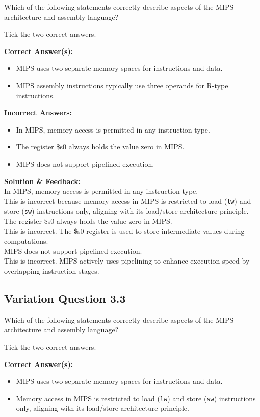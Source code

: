 Which of the following statements correctly describe aspects of the MIPS architecture and assembly language?

Tick the two correct answers.

\textbf{Correct Answer(s):}
\begin{itemize}
    \item MIPS uses two separate memory spaces for instructions and data.
    \item MIPS assembly instructions typically use three operands for R-type instructions.
\end{itemize}

\textbf{Incorrect Answers:}
\begin{itemize}
    \item In MIPS, memory access is permitted in any instruction type.
    \item The register \$s0 always holds the value zero in MIPS.
    \item MIPS does not support pipelined execution.
\end{itemize}

\textbf{Solution \& Feedback:}\\
In MIPS, memory access is permitted in any instruction type.\\
This is incorrect because memory access in MIPS is restricted to load (\texttt{lw}) and store (\texttt{sw}) instructions only, aligning with its load/store architecture principle.\\

The register \$s0 always holds the value zero in MIPS.\\
This is incorrect. The \$s0 register is used to store intermediate values during computations.\\

MIPS does not support pipelined execution.\\
This is incorrect. MIPS actively uses pipelining to enhance execution speed by overlapping instruction stages.

\subsection{Variation Question 3.3}

Which of the following statements correctly describe aspects of the MIPS architecture and assembly language?

Tick the two correct answers.

\textbf{Correct Answer(s):}
\begin{itemize}
    \item MIPS uses two separate memory spaces for instructions and data.
    \item Memory access in MIPS is restricted to load (\texttt{lw}) and store (\texttt{sw}) instructions only, aligning with its load/store architecture principle.
\end{itemize}

